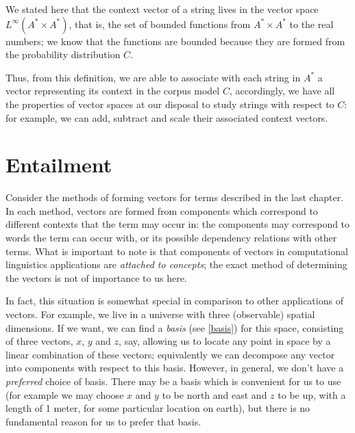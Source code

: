 \documentclass[11pt]{report}
\begin{document}
We stated here that the context vector of a string lives in the vector space $L^\infty(A^*\times A^*)$, that is, the set of bounded functions from $A^*\times A^*$ to the real numbers; we know that the functions are bounded because they are formed from the probability distribution $C$.

Thus, from this definition, we are able to associate with each string in $A^*$ a vector representing its context in the corpus model $C$, accordingly, we have all the properties of vector spaces at our disposal to study strings with respect to $C$: for example, we can add, subtract and scale their associated context vectors.


\section{Entailment}

Consider the methods of forming vectors for terms described in the last chapter. In each method, vectors are formed from components which correspond to different contexts that the term may occur in: the components may correspond to words the term can occur with, or its possible dependency relations with other terms. What is important to note is that components of vectors in computational linguistics applications are \emph{attached to concepts}; the exact method of determining the vectors is not of importance to us here.

In fact, this situation is somewhat special in comparison to other applications of vectors. For example, we live in a universe with three (observable) spatial dimensions. If we want, we can find a \emph{basis} (see \ref{basis}) for this space, consisting of three vectors, $x$, $y$ and $z$, say, allowing us to locate any point in space by a linear combination of these vectors; equivalently we can decompose any vector into components with respect to this basis. However, in general, we don't have a \emph{preferred} choice of basis. There may be a basis which is convenient for us to use (for example we may choose $x$ and $y$ to be north and east and $z$ to be up, with a length of 1 meter, for some particular location on earth), but there is no fundamental reason for us to prefer that basis.
\end{document}
